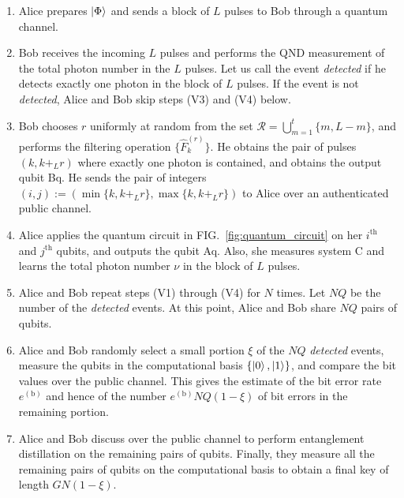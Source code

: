 \documentclass[twocolumn,superscriptaddress,pra,footinbib,notitlepage]{revtex4-1}
\newcommand{\1}{\mbox{1}\hspace{-0.25em}\mbox{l}}
\begin{document}
\begin{enumerate}[label=(V\arabic*)]
\setlength{\parskip}{0cm}
\setlength{\itemsep}{0cm}
\item Alice prepares $\ket{\Phi}$ and sends a block of $L$ pulses to Bob through a quantum channel.
\item Bob receives the incoming $L$ pulses and performs the QND measurement of the total photon number in the $L$ pulses. Let us call the event \textit{detected} if he detects exactly one photon in the block of $L$ pulses. If the event is not \textit{detected}, Alice and Bob skip steps (V3) and (V4) below.
\item Bob chooses $r$ uniformly at random from the set $\mathcal{R}=\bigcup_{m=1}^t\{m, L-m\}$, and performs the filtering operation $\{\hat{F}^{(r)}_k\}$. He obtains the pair of pulses $(k, k+_Lr)$ where exactly one photon is contained, and obtains the output qubit Bq.
He sends the pair of integers $(i, j):=(\min\{k, k+_Lr\}, \max\{k, k+_Lr\})$ to Alice over an authenticated public channel.
\item Alice applies the quantum circuit in FIG.~\ref{fig:quantum_circuit} on her $i^\mathrm{th}$ and $j^\mathrm{th}$ qubits, and outputs the qubit Aq. Also, she measures system C and learns the total photon number $\nu$ in the block of $L$ pulses.
\item Alice and Bob repeat steps (V1) through (V4) for $N$ times. Let $NQ$ be the number of the \textit{detected} events. At this point, Alice and Bob share $NQ$ pairs of qubits.
\item Alice and Bob randomly select a small portion $\xi$ of the $NQ$ \textit{detected} events, measure the qubits in the computational basis $\{\ket{0}, \ket{1}\}$, and compare the bit values over the public channel. This gives the estimate of the bit error rate $e^{(\textrm{b})}$ and hence of the number $e^{(\textrm{b})}NQ(1-\xi)$ of bit errors in the remaining portion.
\item Alice and Bob discuss over the public channel to perform entanglement distillation on the remaining pairs of qubits. Finally, they measure all the remaining pairs of qubits on the computational basis to obtain a final key of length $GN(1-\xi)$.
\end{enumerate}
\end{document}
